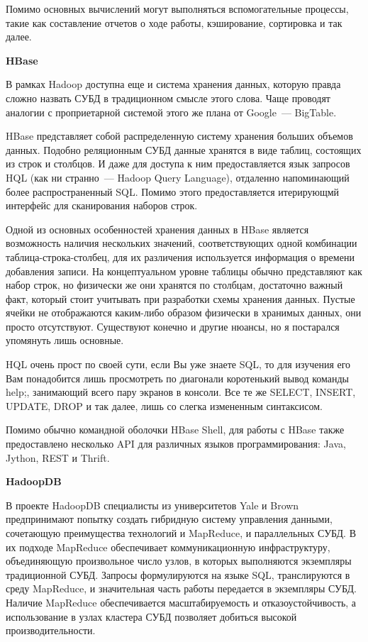 Помимо основных вычислений могут выполняться вспомогательные процессы, такие как составление отчетов о ходе работы, кэширование, 
сортировка и так далее.

\textbf{HBase}

В рамках Hadoop доступна еще и система хранения данных, которую правда сложно назвать СУБД в традиционном смысле этого слова. 
Чаще проводят аналогии с проприетарной системой этого же плана от Google~--- BigTable.

HBase представляет собой распределенную систему хранения больших объемов данных. Подобно реляционным СУБД данные хранятся в 
виде таблиц, состоящих из строк и столбцов. И даже для доступа к ним предоставляется язык запросов HQL (как ни странно~--- 
Hadoop Query Language), отдаленно напоминающий более распространенный SQL. Помимо этого предоставляется итерирующмй интерфейс 
для сканирования наборов строк.

Одной из основных особенностей хранения данных в HBase является возможность наличия нескольких значений, 
соответствующих одной комбинации таблица-строка-столбец, для их различения используется информация о времени добавления записи. 
На концептуальном уровне таблицы обычно представляют как набор строк, но физически же они хранятся по столбцам, достаточно 
важный факт, который стоит учитывать при разработки схемы хранения данных. Пустые ячейки не отображаются каким-либо образом 
физически в хранимых данных, они просто отсутствуют. Существуют конечно и другие нюансы, но я постарался упомянуть лишь основные.

HQL очень прост по своей сути, если Вы уже знаете SQL, то для изучения его Вам понадобится лишь просмотреть по диагонали 
коротенький вывод команды help;, занимающий всего пару экранов в консоли. Все те же SELECT, INSERT, UPDATE, DROP и так далее, 
лишь со слегка измененным синтаксисом.

Помимо обычно командной оболочки HBase Shell, для работы с HBase также предоставлено несколько API для различных языков 
программирования: Java, Jython, REST и Thrift.

\textbf{HadoopDB}

В проекте HadoopDB специалисты из университетов Yale и Brown предпринимают попытку создать гибридную систему управления 
данными, сочетающую преимущества технологий и MapReduce, и параллельных СУБД. В их подходе MapReduce обеспечивает коммуникационную 
инфраструктуру, объединяющую произвольное число узлов, в которых выполняются экземпляры традиционной СУБД. Запросы формулируются 
на языке SQL, транслируются в среду MapReduce, и значительная часть работы передается в экземпляры СУБД. Наличие MapReduce 
обеспечивается масштабируемость и отказоустойчивость, а использование в узлах кластера СУБД позволяет добиться высокой 
производительности. 


